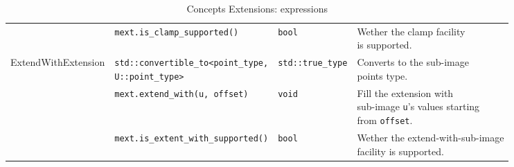 \begin{table}[!htbp]
\begin{scriptsize}
\begin{tabular}{llll}
      \multicolumn{1}{c|}{}                                        & \texttt{mext.is\_clamp\_supported()}          &
      \texttt{bool}                                                & \makecell[l]{Wether the clamp facility                                                    \\is supported.}                                       \\
      \cline{1-4}
      \multicolumn{1}{c|}{\multirow{3}{*}{ExtendWithExtension}}    &
      \makecell[l]{\texttt{std::convertible\_to<point\_type,}                                                                                                  \\\texttt{U::point\_type>}} & \texttt{std::true\_type} &
      \makecell[l]{Converts to the sub-image                                                                                                                   \\ points type.}                                                                                                       \\
      \multicolumn{1}{c|}{}                                        & \texttt{mext.extend\_with(u, offset)}         &
      \texttt{void}                                                & \makecell[l]{Fill the extension with                                                      \\sub-image      \texttt{u}'s values  starting \\ from \texttt{offset}.} \\
      \multicolumn{1}{c|}{}                                        & \texttt{mext.is\_extent\_with\_supported()}   &
      \texttt{bool}                                                & \makecell[l]{Wether the extend-with-sub-image                                             \\ facility is
      supported.}                                                                                                                                              \\
      \cline{1-4}
    \end{tabular}
    \smallskip

    \caption{Concepts Extensions: expressions}
  \end{scriptsize}
  \label{concept.tables.extensions.expressions}
\end{table}


\clearpage

